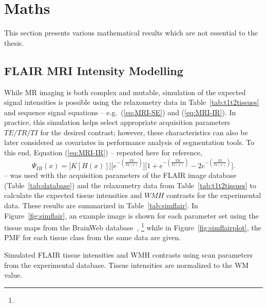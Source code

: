 \chapter{Maths}
This section presents various mathematical results which are not essential to the thesis.
\section{FLAIR MRI Intensity Modelling}\label{s:simflair}
While MR imaging is both complex and mutable,
simulation of the expected signal intensities is possible
using the relaxometry data in Table~\ref{tab:t1t2tissues} and
sequence signal equations -- e.g.\ (\ref{eq:MRI-SE}) and (\ref{eq:MRI-IR}).
In practice, this simulation helps select appropriate acquisition parameters $TE/TR/TI$
for the desired contrast;
however, these characteristics can also be later considered
as covariates in performance analysis of segmentation tools.
To this end, Equation (\ref{eq:MRI-IR}) -- repeated here for reference,
\begin{equation}
  \Psi_{IR}(x) = \bigg[K \left[H(x)\right]\bigg]
    \bigg[e^{-\left(\frac{TE}{T2(x)}\right)}\bigg]
    \bigg[1 + e^{-\left(\frac{TR}{T1(x)}\right)} - 2e^{-\left(\frac{TI}{T1(x)}\right)}\bigg].
\end{equation}
-- was used with the acquisition parameters of the FLAIR image database (Table~\ref{tab:database})
and the relaxometry data from Table~\ref{tab:t1t2tissues}
to calculate the expected tissue intensities and $WMH$ contrasts for the experimental data.
These results are summarized in Table~\ref{tab:simflair}.
In Figure~\ref{fig:simflair}, an example image is shown for each parameter set
using the tissue maps from the BrainWeb database~\cite{Collins1998},%
\footnote{}
while in Figure~\ref{fig:simflairplot}, the PMF for each tissue class from the same data are given.
\begin{table}
  \centering
  \caption{Simulated FLAIR tissue intensities and WMH contrasts
    using scan parameters from the experimental database.
    Tissue intensities are normalized to the WM value.}%
  \label{tab:simflair}
  
\end{table}
